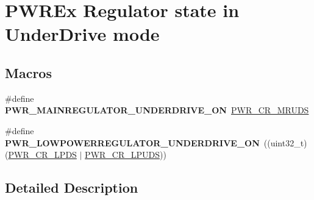 \hypertarget{group___p_w_r_ex___regulator__state__in___under_drive__mode}{}\section{P\+W\+R\+Ex Regulator state in Under\+Drive mode}
\label{group___p_w_r_ex___regulator__state__in___under_drive__mode}
\subsection*{Macros}
\begin{DoxyCompactItemize}
\item 
\#define {\bfseries P\+W\+R\+\_\+\+M\+A\+I\+N\+R\+E\+G\+U\+L\+A\+T\+O\+R\+\_\+\+U\+N\+D\+E\+R\+D\+R\+I\+V\+E\+\_\+\+ON}~\hyperlink{group___peripheral___registers___bits___definition_ga59c516cad11a310e8c5b560b00220d45}{P\+W\+R\+\_\+\+C\+R\+\_\+\+M\+R\+U\+DS}\hypertarget{group___p_w_r_ex___regulator__state__in___under_drive__mode_gafb4358eecfe7e28595e4004e0232b0c7}{}\label{group___p_w_r_ex___regulator__state__in___under_drive__mode_gafb4358eecfe7e28595e4004e0232b0c7}

\item 
\#define {\bfseries P\+W\+R\+\_\+\+L\+O\+W\+P\+O\+W\+E\+R\+R\+E\+G\+U\+L\+A\+T\+O\+R\+\_\+\+U\+N\+D\+E\+R\+D\+R\+I\+V\+E\+\_\+\+ON}~((uint32\+\_\+t)(\hyperlink{group___peripheral___registers___bits___definition_ga3aeb8d6f2539b0a3a4b851aeba0eea66}{P\+W\+R\+\_\+\+C\+R\+\_\+\+L\+P\+DS} $\vert$ \hyperlink{group___peripheral___registers___bits___definition_gac1c7718e2c1a57985f79776683bb5464}{P\+W\+R\+\_\+\+C\+R\+\_\+\+L\+P\+U\+DS}))\hypertarget{group___p_w_r_ex___regulator__state__in___under_drive__mode_gac401bc466719bff4d54854cce6382be0}{}\label{group___p_w_r_ex___regulator__state__in___under_drive__mode_gac401bc466719bff4d54854cce6382be0}

\end{DoxyCompactItemize}


\subsection{Detailed Description}
